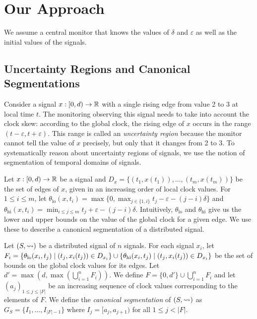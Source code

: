 \section{Our Approach}
We assume a central monitor that knows the values of $\delta$ and $\varepsilon$ as well as the initial values of the signals.

\subsection{Uncertainty Regions and Canonical Segmentations} \label{sec:segment}

Consider a signal $x : [0,d) \to \mathbb{R}$ with a single rising edge from value 2 to 3 at local time $t$.
The monitoring observing this signal needs to take into account the clock skew: according to the global clock, the rising edge of $x$ occurs in the range $(t - \varepsilon, t + \varepsilon)$.
This range is called an \emph{uncertainty region} because the monitor cannot tell the value of $x$ precisely, but only that it changes from 2 to 3.
To systematically reason about uncertainty regions of signals, we use the notion of segmentation of temporal domains of signals.

Let $x : [0,d) \to \mathbb{R}$ be a signal and $D_x = \{(t_1, x(t_1)), \ldots, (t_m, x(t_m))\}$ be the set of edges of $x$, given in an increasing order of local clock values.
For $1 \leq i \leq m$, let $\theta_{\text{lo}}(x,t_i) = \max\{0, \max_{j \in \{1, i\}} t_j - \varepsilon - (j-i)\delta\}$ and $\theta_{\text{hi}}(x,t_i) = \min_{i \leq j \leq m} t_j + \varepsilon - (j-i)\delta$.
Intuitively, $\theta_{\text{lo}}$ and $\theta_{\text{hi}}$ give us the lower and upper bounds on the value of the global clock for a given edge.
We use these to describe a canonical segmentation of a distributed signal.

Let $(S,{\rightsquigarrow})$ be a distributed signal of $n$ signals.
For each signal $x_i$, let $F_i = \{\theta_{\text{lo}}(x_i, t_j) \st (t_j, x_i(t_j)) \in D_{x_i}\} \cup \{\theta_{\text{hi}}(x_i, t_j) \st (t_j, x_i(t_j)) \in D_{x_i}\}$ be the set of bounds on the global clock values for its edges.
Let $d' = \max(d, \max (\bigcup_{i = 1}^{n} F_i))$. 
We define $F = \{0, d'\} \cup \bigcup_{i = 1}^{n} F_i$ and let $(a_j)_{1 \leq j \leq |F|}$ be an increasing sequence of clock values corresponding to the elements of $F$.
We define the \emph{canonical segmentation} of $(S,{\rightsquigarrow})$ as $G_S = \{I_1, \ldots, I_{|F| - 1}\}$ where $I_j = [a_j, a_{j+1})$ for all $1 \leq j < |F|$.

